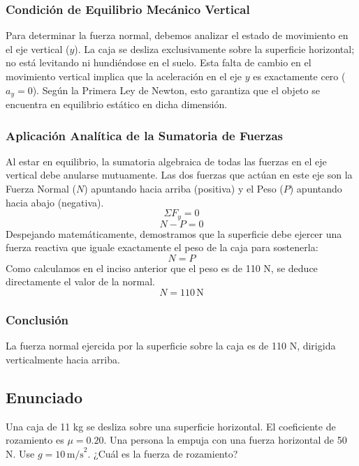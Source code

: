 \documentclass[12pt]{article}
\begin{document}
\subsubsection*{Condición de Equilibrio Mecánico Vertical}
Para determinar la fuerza normal, debemos analizar el estado de movimiento en el eje vertical ($y$). La caja se desliza exclusivamente sobre la superficie horizontal; no está levitando ni hundiéndose en el suelo. Esta falta de cambio en el movimiento vertical implica que la aceleración en el eje $y$ es exactamente cero ($a_y = 0$). Según la Primera Ley de Newton, esto garantiza que el objeto se encuentra en equilibrio estático en dicha dimensión.

\subsubsection*{Aplicación Analítica de la Sumatoria de Fuerzas}
Al estar en equilibrio, la sumatoria algebraica de todas las fuerzas en el eje vertical debe anularse mutuamente. Las dos fuerzas que actúan en este eje son la Fuerza Normal ($N$) apuntando hacia arriba (positiva) y el Peso ($P$) apuntando hacia abajo (negativa).
\begin{equation}
    \Sigma F_y = 0
\end{equation}
\begin{equation}
    N - P = 0
\end{equation}
Despejando matemáticamente, demostramos que la superficie debe ejercer una fuerza reactiva que iguale exactamente el peso de la caja para sostenerla:
\begin{equation}
    N = P
\end{equation}
Como calculamos en el inciso anterior que el peso es de 110 N, se deduce directamente el valor de la normal.
\begin{equation}
    N = 110 \, \text{N}
\end{equation}

\subsubsection*{Conclusión}
La fuerza normal ejercida por la superficie sobre la caja es de 110 N, dirigida verticalmente hacia arriba.

\newpage

\subsection*{Enunciado}
Una caja de 11 kg se desliza sobre una superficie horizontal. El coeficiente de rozamiento es $\mu = 0.20$. Una persona la empuja con una fuerza horizontal de 50 N. Use $g = 10 \, \text{m/s}^2$. ¿Cuál es la fuerza de rozamiento?
\end{document}
